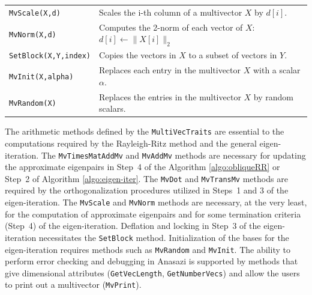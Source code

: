 \documentclass[acmtoms]{acmtrans2m}
\newcommand{\aspace}[1]{\texttt{#1}}
\begin{document}
\begin{table}
\begin{center}
\begin{tabular}{| p{4cm} | p{8cm} |}
{\tt MvScale(X,d)}    & Scales the i-th column of a multivector $X$ by $d[i]$. \\

{\tt MvNorm(X,d)}     & Computes the 2-norm of each vector of
$X$: $d[i] \leftarrow \|X[i]\|_2$  \\\hline

{\tt SetBlock(X,Y,index)} & Copies the vectors in $X$ to a subset of vectors in
$Y$. \\

{\tt MvInit(X,alpha)} & Replaces each entry in the multivector $X$ with a scalar $\alpha$.  \\

{\tt MvRandom(X)} & Replaces the entries in the multivector $X$ by random
scalars. \\

\hline
\end{tabular}
\end{center}
\end{table}



The arithmetic methods defined by the \aspace{MultiVecTraits} are essential to the computations
required by the Rayleigh-Ritz method and the general eigen-iteration.  The 
\aspace{MvTimesMatAddMv} and \aspace{MvAddMv} methods are necessary for updating the approximate 
eigenpairs 
in Step~4 of the Algorithm \ref{algo:obliqueRR}
or Step~2 of Algorithm \ref{algo:eigen-iter}.
The \aspace{MvDot} and \aspace{MvTransMv} methods are required by the orthogonalization procedures
utilized in Steps~1 and 3 of the eigen-iteration.  The \aspace{MvScale} and \aspace{MvNorm}
methods are necessary, at the very least, for the computation of approximate eigenpairs and for  
some termination criteria (Step~4) of the eigen-iteration. 
Deflation and locking in Step~3 of the eigen-iteration necessitates the \aspace{SetBlock} method.
Initialization of the bases for the eigen-iteration requires
methods such as \aspace{MvRandom} and \aspace{MvInit}.
The ability to perform error checking and debugging in Anasazi is supported by methods that give 
dimensional attributes (\aspace{GetVecLength}, \aspace{GetNumberVecs}) and allow the users to print
out a multivector (\aspace{MvPrint}). 
\end{document}
